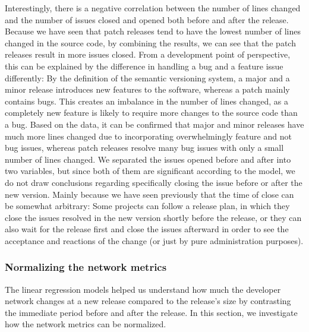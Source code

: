 Interestingly, there is a negative correlation between the number of lines changed and the number of issues closed and opened both before and after the release. Because we have seen that patch releases tend to have the lowest number of lines changed in the source code, by combining the results, we can see that the patch releases result in more issues closed. From a development point of perspective, this can be explained by the difference in handling a bug and a feature issue differently: By the definition of the semantic versioning system, a major and a minor release introduces new features to the software, whereas a patch mainly contains bugs. This creates an imbalance in the number of lines changed, as a completely new feature is likely to require more changes to the source code than a bug. Based on the data, it can be confirmed that major and minor releases have much more lines changed due to incorporating overwhelmingly feature and not bug issues, whereas patch releases resolve many bug issues with only a small number of lines changed. We separated the issues opened before and after into two variables, but since both of them are significant according to the model, we do not draw conclusions regarding specifically closing the issue before or after the new version. Mainly because we have seen previously that the time of close can be somewhat arbitrary: Some projects can follow a release plan, in which they close the issues resolved in the new version shortly before the release, or they can also wait for the release first and close the issues afterward in order to see the acceptance and reactions of the change (or just by pure administration purposes). 

\subsubsection{Normalizing the network metrics}

The linear regression models helped us understand how much the developer network changes at a new release compared to the release's size by contrasting the immediate period before and after the release. In this section, we investigate how the network metrics can be normalized.\\

